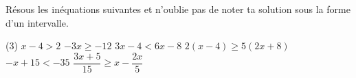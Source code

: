 %
%
    Résous les inéquations suivantes et n'oublie pas de noter ta solution sous la forme d'un intervalle.
    \begin{tasks}(3)
        \task $x-4 > 2$
        \task $-3x \ge -12$
        \task $3x-4 < 6x-8$
        \task $2(x-4) \ge 5(2x+8)$
        \task $-x + 15 < -35$
        \task $\dfrac{3x+5}{15}\ge x - \dfrac{2x}{5}$
    \end{tasks}
